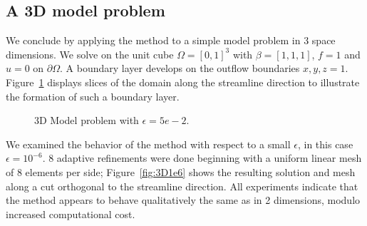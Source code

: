 \documentclass[final,leqno]{siamltex}
\begin{document}
\subsection{A 3D model problem}

We conclude by applying the method to a simple model problem in 3 space dimensions.  We solve on the unit cube $\Omega = [0,1]^3$ with $\beta = [1,1,1]$, $f=1$ and $u=0$ on $\partial \Omega$.  A boundary layer develops on the outflow boundaries $x,y,z = 1$.  Figure~\ref{fig:3D5e2} displays slices of the domain along the streamline direction to illustrate the formation of such a boundary layer.  

\begin{figure}[!h]
\centering
{}
\caption{3D Model problem with $\epsilon = 5e-2$.}
\label{fig:3D5e2}
\end{figure}

We examined the behavior of the method with respect to a small $\epsilon$, in this case $\epsilon = 10^{-6}$.  8 adaptive refinements were done beginning with a uniform linear mesh of 8 elements per side; Figure~\ref{fig:3D1e6} shows the resulting solution and mesh along a cut orthogonal to the streamline direction.  All experiments indicate that the method appears to behave qualitatively the same as in 2 dimensions, modulo increased computational cost.
\end{document}
